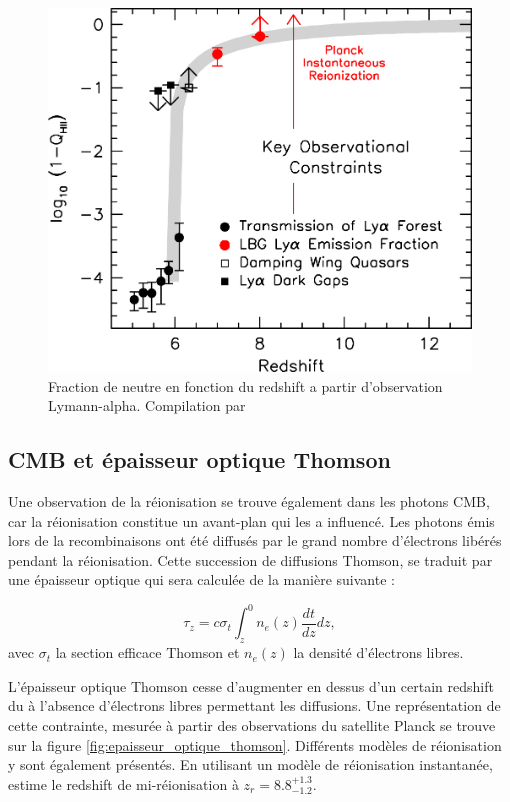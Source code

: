 \begin{figure}
        \includegraphics[width=.95\linewidth]{img/01/xionconstrains.jpg} 
        \caption[Fraction de neutre]{Fraction de neutre en fonction du redshift a partir d'observation Lymann-alpha.
        Compilation par \cite{2015ApJ...811..140B}}
 		\label{fig:compile_constrains}
\end{figure}


\subsection{CMB et épaisseur optique Thomson}

Une observation de la réionisation se trouve également dans les photons \ac{CMB}, car la réionisation constitue un avant-plan qui les a influencé. 
Les photons émis lors de la recombinaisons ont été diffusés par le grand nombre d'électrons libérés pendant la réionisation.
Cette succession de diffusions Thomson, se traduit par une épaisseur optique qui sera calculée de la manière suivante : 

\begin{equation}
\tau_z = c \sigma_t \int_z^0 n_e (z) \frac{dt}{dz} dz,
\end{equation}
avec $\sigma_t$ la section efficace Thomson et $n_e (z)$ la densité d'électrons libres.

L'épaisseur optique Thomson cesse d'augmenter en dessus d'un certain redshift du à l’absence d'électrons libres permettant les diffusions.
Une représentation de cette contrainte, mesurée à partir des observations du satellite Planck se trouve sur la figure \ref{fig:epaisseur_optique_thomson}.
Différents modèles de réionisation y sont également présentés.
En utilisant un modèle de réionisation instantanée, \cite{planck_collaboration_planck_2016} estime le redshift de mi-réionisation à $z_r = 8.8 ^{+1.3}_{-1.2}$.


